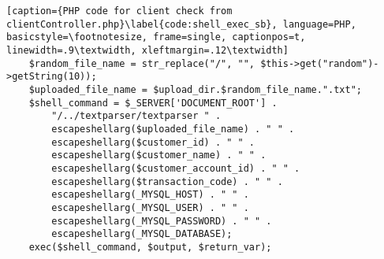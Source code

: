 \begin{lstlisting}[caption={PHP code for client check from clientController.php}\label{code:shell_exec_sb}, language=PHP, basicstyle=\footnotesize, frame=single, captionpos=t, linewidth=.9\textwidth, xleftmargin=.12\textwidth]
    $random_file_name = str_replace("/", "", $this->get("random")->getString(10));
    $uploaded_file_name = $upload_dir.$random_file_name.".txt";
    $shell_command = $_SERVER['DOCUMENT_ROOT'] .
        "/../textparser/textparser " .
        escapeshellarg($uploaded_file_name) . " " .
        escapeshellarg($customer_id) . " " .
        escapeshellarg($customer_name) . " " .
        escapeshellarg($customer_account_id) . " " .
        escapeshellarg($transaction_code) . " " .
        escapeshellarg(_MYSQL_HOST) . " " .
        escapeshellarg(_MYSQL_USER) . " " .
        escapeshellarg(_MYSQL_PASSWORD) . " " .
        escapeshellarg(_MYSQL_DATABASE);
    exec($shell_command, $output, $return_var);
\end{lstlisting}
\clearpage